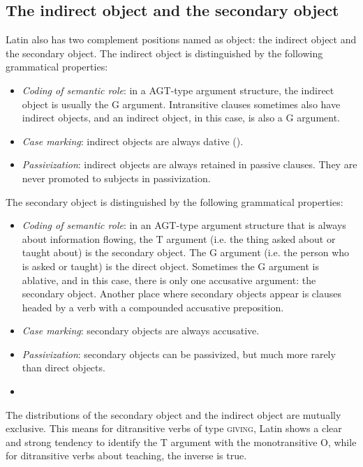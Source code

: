 \documentclass[a4paper, oneside, 12pt]{report}
\newcommand{\classify}[1]{{\textsc{#1}}}
\begin{document}
\subsection{The indirect object and the secondary object}\label{sec:vp.complement.indirect-object}

Latin also has two complement positions named as object:
the indirect object and the secondary object.
The indirect object is distinguished by the following grammatical properties:
\begin{itemize}
    \item \emph{Coding of semantic role}: in a AGT-type argument structure, 
    the indirect object is usually the G argument.
    Intransitive clauses sometimes also have indirect objects, 
    and an indirect object, in this case, is also a G argument.
    \item \emph{Case marking}: indirect objects are always dative
    ().
    \item \emph{Passivization}: indirect objects are always retained in passive clauses. 
    They are never promoted to subjects in passivization.
\end{itemize}

The secondary object is distinguished by the following grammatical properties:
\begin{itemize}
    \item \emph{Coding of semantic role}: in an AGT-type argument structure
    that is always about information flowing,
    the T argument (i.e. the thing asked about or taught about) is the secondary object.
    The G argument (i.e. the person who is asked or taught) is the direct object.
    Sometimes the G argument is ablative, and in this case, 
    there is only one accusative argument: the secondary object.
    Another place where secondary objects appear is 
    clauses headed by a verb with a compounded accusative preposition. %
    \item \emph{Case marking}: secondary objects are always accusative.
    \item \emph{Passivization}: secondary objects can be passivized, but much more rarely than direct objects.
    \item %
\end{itemize}

The distributions of the secondary object and the indirect object 
are mutually exclusive.
This means for ditransitive verbs of type \classify{giving}, 
Latin shows a clear and strong tendency to identify the T argument with the monotransitive O,
while for ditransitive verbs about teaching,
the inverse is true.
\end{document}
